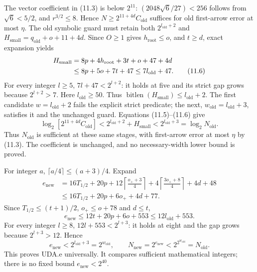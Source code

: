 \documentclass[11pt]{article}
\theoremstyle{plain}
\theoremstyle{definition}
\theoremstyle{remark}
\begin{document}
The vector coefficient in (11.3) is below $2^{11}$:
$(2048\sqrt6/27)<256$ follows from $\sqrt6<5/2$, and $r^{3/2}\le8$.
Hence $N\ge2^{11+4d}C_{\mathrm{old}}$ suffices for old first-arrow error
at most $\eta$. The old symbolic guard must retain both
$2^{l_{\mathrm{old}}+2}$ and $H_{\mathrm{small}}=q_{\mathrm{old}}+o+11+4d$.
Since $O\ge1$ gives $h_{\mathrm{root}}\le o$, and $t\ge d$, exact expansion yields
\begin{align}
 H_{\mathrm{small}}&=8p+4h_{\mathrm{root}}+3t+o+47+4d\notag\\
 &\le8p+5o+7t+47\le7l_{\mathrm{old}}+47.\tag{11.6}
\end{align}
For every integer $l\ge5$, $7l+47<2^{l+2}$: it holds at five and its
strict gap grows because $2^{l+2}>7$. Here $l_{\mathrm{old}}\ge50$.
Thus $\operatorname{bitlen}(H_{\mathrm{small}})\le l_{\mathrm{old}}+2$.
The first candidate $w=l_{\mathrm{old}}+2$ fails the explicit strict
predicate; the next, $w_{\mathrm{old}}=l_{\mathrm{old}}+3$, satisfies it
and the unchanged guard. Equations (11.5)--(11.6) give
\begin{equation}
 \log_2[2^{11+4d}C_{\mathrm{old}}]
 <2^{l_{\mathrm{old}}+2}+H_{\mathrm{small}}
 <2^{l_{\mathrm{old}}+3}=\log_2N_{\mathrm{old}}.\tag{11.7}
\end{equation}
Thus $N_{\mathrm{old}}$ is sufficient at these same stages, with first-arrow
error at most $\eta$ by (11.3). The coefficient is unchanged, and no
necessary-width lower bound is proved.

For integer $a$, $\lceil a/4\rceil\le(a+3)/4$. Expand
\begin{align*}
 e_{\mathrm{new}}
 &=16T_{1/2}+20p+12\left\lceil\frac{o_++3}{4}\right\rceil
     +4\left\lceil\frac{3o_++8}{4}\right\rceil+4d+48\\
 &\le16T_{1/2}+20p+6o_++4d+77.
\end{align*}
Since $T_{1/2}\le(t+1)/2$, $o_+\le o+78$ and $d\le t$,
\begin{equation}
 e_{\mathrm{new}}\le12t+20p+6o+553\le12l_{\mathrm{old}}+553.\tag{11.8}
\end{equation}
For every integer $l\ge8$, $12l+553<2^{l+3}$: it holds at eight and the
gap grows because $2^{l+3}>12$. Hence
\begin{equation}
 e_{\mathrm{new}}<2^{l_{\mathrm{old}}+3}=2^{w_{\mathrm{old}}},\qquad
 N_{\mathrm{new}}=2^{e_{\mathrm{new}}}<2^{2^{w_{\mathrm{old}}}}=N_{\mathrm{old}}.
 \tag{11.9}
\end{equation}
This proves UDA.e universally. It compares sufficient mathematical integers;
there is no fixed bound $e_{\mathrm{new}}<2^{40}$.
\end{document}
